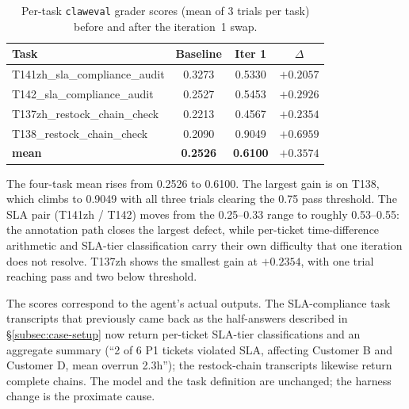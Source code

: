 \begin{table}[ht]
\caption{Per-task \texttt{claweval} grader scores (mean of 3 trials per task) before and after the iteration~1 swap.}
\label{tab:case-results}
\centering
\begin{tabular}{lccc}
\toprule
Task & Baseline & Iter 1 & $\Delta$ \\
\midrule
T141zh\_sla\_compliance\_audit  & 0.3273          & 0.5330          & $+0.2057$ \\
T142\_sla\_compliance\_audit    & 0.2527          & 0.5453          & $+0.2926$ \\
T137zh\_restock\_chain\_check   & 0.2213          & 0.4567          & $+0.2354$ \\
T138\_restock\_chain\_check     & 0.2090          & 0.9049          & $+0.6959$ \\
\midrule
\textbf{mean}                    & \textbf{0.2526} & \textbf{0.6100} & $\boldsymbol{+0.3574}$ \\
\bottomrule
\end{tabular}
\end{table}

The four-task mean rises from 0.2526 to 0.6100. The largest gain is on T138, which climbs to 0.9049 with all three trials clearing the 0.75 pass threshold. The SLA pair (T141zh / T142) moves from the 0.25--0.33 range to roughly 0.53--0.55: the annotation path closes the largest defect, while per-ticket time-difference arithmetic and SLA-tier classification carry their own difficulty that one iteration does not resolve. T137zh shows the smallest gain at $+0.2354$, with one trial reaching pass and two below threshold.

The scores correspond to the agent's actual outputs. The SLA-compliance task transcripts that previously came back as the half-answers described in \S\ref{subsec:case-setup} now return per-ticket SLA-tier classifications and an aggregate summary (``2 of 6 P1 tickets violated SLA, affecting Customer B and Customer D, mean overrun 2.3h''); the restock-chain transcripts likewise return complete chains. The model and the task definition are unchanged; the harness change is the proximate cause.
